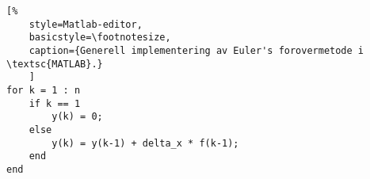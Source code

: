 \documentclass[../main.tex]{subfiles}
\begin{document}
\begin{minipage}{\textwidth}

    \begin{lstlisting}[%
    style=Matlab-editor,
    basicstyle=\footnotesize,
    caption={Generell implementering av Euler's forovermetode i \textsc{MATLAB}.}
    ]
for k = 1 : n
    if k == 1
        y(k) = 0;
    else
        y(k) = y(k-1) + delta_x * f(k-1);
    end
end
\end{lstlisting}\label{lst:kap1_euler}

\end{minipage}
\end{document}

